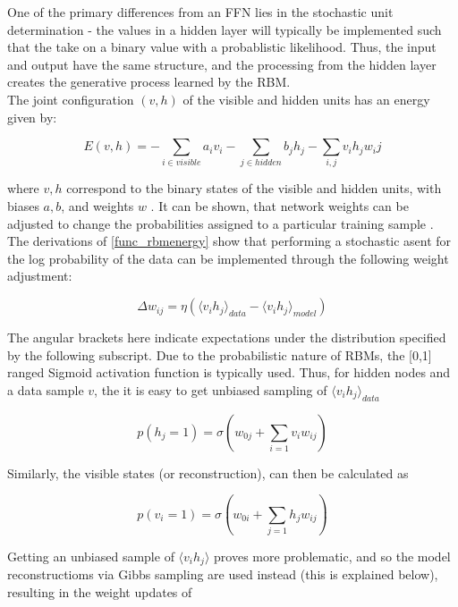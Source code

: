 \documentclass[a4paper,11pt,oneside]{article}
\theoremstyle{plain}
\theoremstyle{definition}
\begin{document}
One of the primary differences from an FFN lies in the stochastic unit determination - the values in a hidden layer will typically be implemented such that the take on a binary value with a probablistic likelihood. Thus, the input and output have the same structure, and the processing from the hidden layer creates the generative process learned by the RBM. 
~\\
The joint configuration $(v,h)$ of the visible and hidden units has an energy given by:

\begin{equation}\label{func_rbmenergy}
E(v,h) = - \sum_{i \in visible} a_iv_i - \sum_{j \in hidden} b_jh_j - \sum_{i,j}v_ih_jw_ij
\end{equation}

where $v,h$ correspond to the binary states of the visible and hidden units, with biases $a,b$, and weights $w$ \cite{Hinton5}. It can be shown, that network weights can be adjusted to change the probabilities assigned to a particular training sample \cite{Hinton5}. The derivations of \ref{func_rbmenergy} show that performing a stochastic asent for the log probability of the data can be implemented through the following weight adjustment:

\begin{equation}
\Delta w_{ij} = \eta (\langle v_ih_j\rangle_{data} - \langle v_ih_j\rangle_{model})
\end{equation}

The angular brackets here indicate expectations under the distribution specified by the following subscript. Due to the probabilistic nature of RBMs, the [0,1] ranged Sigmoid activation function is typically used. Thus, for hidden nodes and a data sample $v$, the it is easy to get unbiased sampling of $\langle v_ih_j \rangle_{data}$

\begin{equation}
p(h_j=1) = \sigma(w_{0j} +  \sum_{i=1}v_iw_{ij})
\end{equation}

Similarly, the visible states (or reconstruction), can then be calculated as 

\begin{equation}
p(v_i=1) = \sigma(w_{0i} + \sum_{j=1}h_jw_{ij})
\end{equation}


Getting an unbiased sample of $\langle v_i h_j \rangle$ proves more problematic, and so the model reconstructioms via Gibbs sampling are used instead (this is explained below), resulting in the weight updates of
\end{document}
